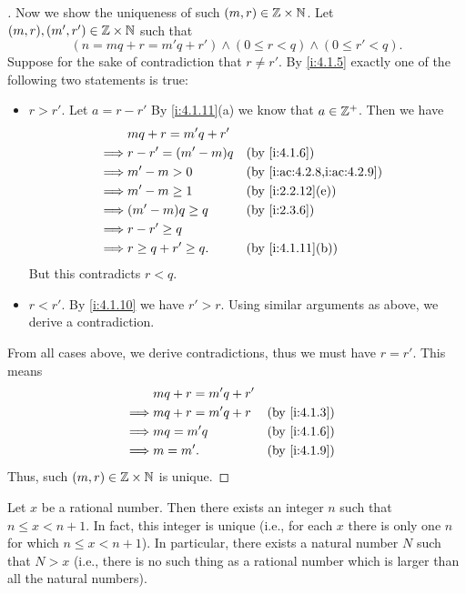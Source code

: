 \begin{proof}[]
  Now we show the uniqueness of such \((m, r) \in \mathbb{Z} \times \mathbb{N}\).
  Let \((m, r), (m', r') \in \mathbb{Z} \times \mathbb{N}\) such that
  \[
    (n = mq + r = m'q + r') \land (0 \leq r < q) \land (0 \leq r' < q).
  \]
  Suppose for the sake of contradiction that \(r \neq r'\).
  By \cref{i:4.1.5} exactly one of the following two statements is true:
  \begin{itemize}
    \item \(r > r'\).
          Let \(a = r - r'\)
          By \cref{i:4.1.11}(a) we know that \(a \in \mathbb{Z}^+\).
          Then we have
          \begin{align*}
                     & mq + r = m'q + r'                                     \\
            \implies & r - r' = (m' - m)q    &  & \by{i:4.1.6}               \\
            \implies & m' - m > 0            &  & \by{i:ac:4.2.8,i:ac:4.2.9} \\
            \implies & m' - m \geq 1         &  & \by{i:2.2.12}[e]           \\
            \implies & (m' - m)q \geq q      &  & \by{i:2.3.6}               \\
            \implies & r - r' \geq q                                         \\
            \implies & r \geq q + r' \geq q. &  & \by{i:4.1.11}[b]
          \end{align*}
          But this contradicts \(r < q\).
    \item \(r < r'\).
          By \cref{i:4.1.10} we have \(r' > r\).
          Using similar arguments as above, we derive a contradiction.
  \end{itemize}
  From all cases above, we derive contradictions, thus we must have \(r = r'\).
  This means
  \begin{align*}
             & mq + r = m'q + r'                   \\
    \implies & mq + r = m'q + r  &  & \by{i:4.1.3} \\
    \implies & mq = m'q          &  & \by{i:4.1.6} \\
    \implies & m = m'.           &  & \by{i:4.1.9}
  \end{align*}
  Thus, such \((m, r) \in \mathbb{Z} \times \mathbb{N}\) is unique.
\end{proof}

\begin{prop}\label{i:4.4.1}
  Let \(x\) be a rational number.
  Then there exists an integer \(n\) such that \(n \leq x < n + 1\).
  In fact, this integer is unique (i.e., for each \(x\) there is only one \(n\) for which \(n \leq x < n + 1\)).
  In particular, there exists a natural number \(N\) such that \(N > x\)
  (i.e., there is no such thing as a rational number which is larger than all the natural numbers).
\end{prop}

